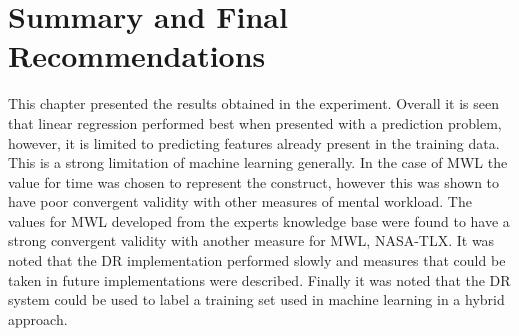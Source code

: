 \section{Summary and Final Recommendations}

This chapter presented the results obtained in the experiment. Overall it is seen that linear regression performed best when presented with a prediction problem, however, it is limited to predicting features already present in the training data. This is a strong limitation of machine learning generally. In the case of MWL the value for time was chosen to represent the construct, however this was shown to have poor convergent validity with other measures of mental workload. The values for MWL developed from the experts knowledge base were found to have a strong convergent validity with another measure for MWL, NASA-TLX. It was noted that the DR implementation performed slowly and measures that could be taken in future implementations were described. Finally it was noted that the DR system could be used to label a training set used in machine learning in a hybrid approach. 